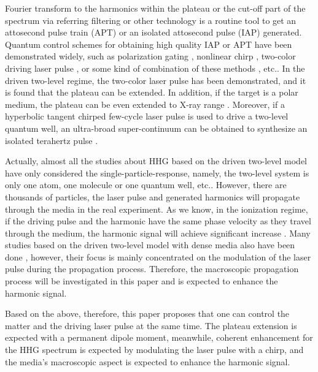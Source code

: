 \documentclass[10pt,letterpaper]{article}
\begin{document}
Fourier transform to the harmonics within the plateau or the cut-off part of the spectrum via  referring filtering or other technology is a routine tool to get an attosecond pulse train (APT) or an isolated attosecond pulse (IAP) generated. Quantum control schemes for obtaining high quality IAP or APT have been demonstrated widely, such as polarization gating \cite{Corkum-PRL-1993,Sansone-Polarization-gate-Nature-2006}, nonlinear chirp \cite{Carrera-Chirp-PRA-2007}, two-color driving laser pulse \cite{ZengZhinan-Two-Color-PRL-2007}, or some kind of combination of these methods \cite{ChangZenghu-Combination-PRA-2007}, etc.. In the driven two-level regime, the two-color laser pulse \cite{Gong-Two-Level-Two-Color-JMO-1999,WANG-ZHONG-YANG-Two-Level-Attosecond-generation-1999,LiuChengpu-Two-Level-PRA-2004} has been demonstrated, and it is found that the plateau can be extended. In addition, if the target is a polar medium, the plateau can be even extended to X-ray range \cite{YangWeifeng-Two-Level-PLA-2007}. Moreover, if a hyperbolic tangent chirped few-cycle laser pulse is used to drive a two-level quantum well, an ultra-broad super-continuum can be obtained to synthesize an isolated terahertz pulse \cite{CuiNi2010NJP-wavelet}. 

Actually, almost all the studies about HHG based on the driven two-level model have only considered the single-particle-response, namely, the two-level system is only one atom, one molecule or one quantum well, etc.. However, there are thousands of particles, the laser pulse and generated harmonics will propagate through the media in the real experiment. As we know, in the ionization regime, if the driving pulse and the harmonic have the same phase velocity as they travel through the medium, the harmonic signal will achieve significant increase \cite{2009Review}. Many studies based on the driven two-level model with dense media also have been done \cite{Kalosha-Two-Level-PRL-1999,Xiao-Jian-PRA-2002,Xia-Keyu-OE-2005,Pan-Ruiqin-Permanent-dipole-moment-2011,Ziolkowski-Two-Level-Method-PRA-1995}, however, their focus is mainly concentrated on the modulation of the laser pulse during the propagation process. Therefore, the macroscopic propagation process will be investigated in this paper and is expected to enhance the harmonic signal. 

Based on the above, therefore, this paper proposes that one can control the matter and the driving laser pulse at the same time. The plateau extension is expected with a permanent dipole moment, meanwhile, coherent enhancement for the HHG spectrum is expected by modulating the laser pulse with a chirp, and the media's macroscopic aspect is expected to enhance the harmonic signal.
\end{document}
